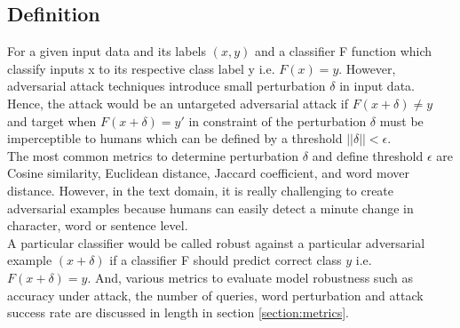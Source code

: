 \documentclass[%
	BCOR=8mm, %
	DIV=12,
	toc=bibliography, %
	toc=listof, %
	oneside, %
	egregdoesnotlikesansseriftitles, %
	]{scrbook}
\begin{document}
\subsection{Definition}
\label{subsection:definition}
For a given input data and its labels $(x, y)$ and a classifier F function which classify inputs x to its respective class label y i.e. $F (x) = y$. However, adversarial attack techniques introduce small perturbation $\delta$ in input data.\\
Hence, the attack would be an untargeted adversarial attack if $F(x+\delta)\not=y$ and target when $F(x+\delta)=y'$ in constraint of the perturbation $\delta$ must be imperceptible to humans which can be defined by a threshold  $||\delta||<\epsilon$. \\
The most common metrics to determine perturbation $\delta$ and define threshold $\epsilon$ are Cosine similarity, Euclidean distance, Jaccard coefficient, and word mover distance.  However, in the text domain, it is really challenging to create adversarial examples because humans can easily detect a minute change in character, word or sentence level.\\
A particular classifier would be called robust against a particular adversarial example  $(x+\delta)$ if a classifier F should predict correct class $y$  i.e.  $F(x+\delta)=y$. And, various metrics to evaluate model robustness such as accuracy under attack,  the number of queries, word perturbation and  attack success rate  are discussed in length in section \ref{section:metrics}.
\end{document}
